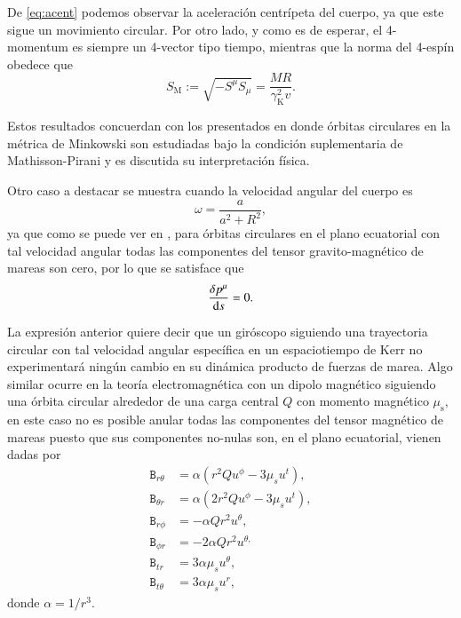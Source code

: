 De \eqref{eq:acent} podemos observar la aceleración centrípeta del cuerpo, ya que este sigue un movimiento circular. Por otro lado, y como es de esperar, el 4-momentum es siempre un 4-vector tipo tiempo, mientras que la norma del 4-espín obedece que
\begin{equation}
\label{eq:78}
S_{\mathrm{M}} :=  \sqrt{- S^{\mu} S_{\mu}} = \frac{MR}{\gamma^2_{\mathrm{K}}v}.
\end{equation}

Estos resultados concuerdan con los presentados en \cite{Costa-Herdeiro-Natario-Zilhao} donde órbitas circulares en la métrica de Minkowski son estudiadas bajo la condición suplementaria de Mathisson-Pirani y es discutida su interpretación física.

Otro caso a destacar se muestra cuando la velocidad angular del cuerpo es
\begin{equation}
\omega = \frac{a}{a^2+R^2},
\end{equation}
ya que como se puede ver en \cite{Costa-Natario-Zilhao}, para órbitas circulares en el plano ecuatorial con tal velocidad angular todas las componentes del tensor gravito-magnético de mareas son cero, por lo que se satisface que
\begin{equation}
\label{eq:higual0}
\frac{\delta p^{\mu}}{\mathrm{d}s}  = 0.
\end{equation}

La expresión anterior quiere decir que un giróscopo siguiendo una trayectoria circular con tal velocidad angular específica en un espaciotiempo de Kerr no experimentará ningún cambio en su dinámica producto de fuerzas de marea. Algo similar ocurre en la teoría electromagnética con un dipolo magnético siguiendo una órbita circular alrededor de una carga central $Q$ con momento magnético $\mu_{\mathrm{s}}$, en este caso no es posible anular todas las componentes del tensor magnético de mareas puesto que sus componentes no-nulas son, en el plano ecuatorial, vienen dadas por
\begin{align}
\mathtt{B}_{r \theta} &= \alpha \left( r^2 Q u^{\phi} - 3\mu_s u^t \right),\\
\mathtt{B}_{\theta r} &= \alpha \left( 2r^2 Q u^{\phi} - 3\mu_s u^t \right),\\
\mathtt{B}_{r \phi} &= -\alpha Q r^2 u^{\theta},\\
\mathtt{B}_{\phi r} &= -2\alpha Q r^2 u^{\theta,}\\
\mathtt{B}_{t r} &= 3 \alpha \mu_s u^{\theta},\\
\mathtt{B}_{t \theta} &= 3 \alpha \mu_s u^{r},
\end{align}
donde $\alpha = 1/r^3$.

